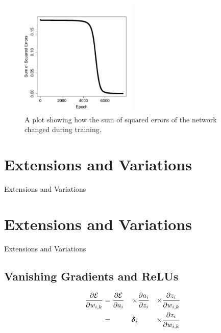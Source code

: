 \documentclass[xcolor={table}]{beamer}
\newcommand{\SectionSlide}[2][]{
	\ifthenelse{\isempty{#1}}
		{\section{#2}\begin{frame} \begin{center}\begin{huge}#2\end{huge}\end{center}\end{frame}}
		{\section[#1]{#2}\begin{frame} \begin{center}\begin{huge}#2\end{huge}\end{center}\end{frame}}
}
\begin{document}
 \begin{frame} 
\begin{figure}[t]
\centerline{
\includegraphics[width=0.5\textwidth]{./images/fmlpda_8_17.pdf}
}
\caption[A plot showing how the sum of squared errors of the network changed during training.]{A plot showing how the sum of squared errors of the network changed during training.}
\label{fig:SSEperTrainingIterationNN1}
\end{figure}
\end{frame} 


\SectionSlide{Extensions and Variations}


\subsection{Vanishing Gradients and ReLUs}

 \begin{frame} 
\begin{alignat}{5}
\frac{\partial \mathcal{E}}{\partial w_{i,k}} &= \frac{\partial \mathcal{E}}{\partial a_i} &\times&  \frac{\partial a_i}{\partial z_i} & \times &\frac{\partial z_i}{\partial w_{i,k}} \notag\\
&= &\boldsymbol{\delta}_i& & \times  &\frac{\partial z_i}{\partial w_{i,k}} \notag\\
\label{eq:vanishinggradientchainsimplified}
\end{alignat}
\end{frame} 
\end{document}
